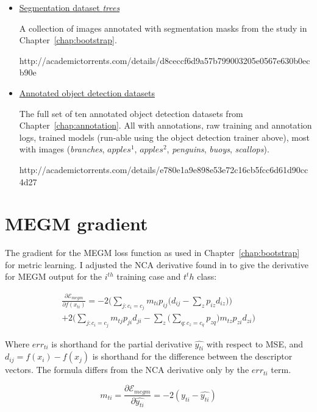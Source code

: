  \begin{itemize}
\item \href{http://academictorrents.com/details/d8ceccf6d9a57b799003205e0567e630b0ecb90e}{Segmentation dataset \emph{trees}} \par
A collection of images annotated with segmentation masks from the study in Chapter~\ref{chap:bootstrap}. \par\noindent http://academictorrents.com/details/d8ceccf6d9a57b799003205e0567e630b0ecb90e

\item \href{http://academictorrents.com/details/e780e1a9e898e53e72c16cb5fcc6d61d90cc4d27}{Annotated object detection datasets} \par
The full set of ten annotated object detection datasets from Chapter~\ref{chap:annotation}. All with annotations, raw training and annotation logs, trained models (run-able using the object detection trainer above), most with images (\emph{branches}, $apples^1$, $apples^2$, \emph{penguins}, \emph{buoys}, \emph{scallops}). \par\noindent
http://academictorrents.com/details/e780e1a9e898e53e72c16cb5fcc6d61d90cc4d27

\end{itemize}

\chapter{MEGM gradient}
\label{chap:megm_appendix} 

The gradient for the \gls{MEGM} loss function as used in Chapter~\ref{chap:bootstrap} for metric learning. I adjusted the \gls{NCA} derivative found in \cite {Salakhutdinov2007a} to give the derivative for \gls{MEGM} output for the $ i^{th} $ training case and $ t^th $ class:

\begin{multline}
\label{eq:megm_grad}
\frac{\partial \mathcal{E}_{megm}}{\partial f(x_{ti})} = 
  -2 \bigg( \sum_{j:c_i = c_j}  m_{ti} {p_{ij} \Big( d_{ij} - \sum_z{p_{iz}d_{iz}} \Big) } \bigg)\\
  +2 \bigg( \sum_{j:c_i = c_j} m_{tj}{p_{ji}d_{ji} - \sum_z{\Big( \sum_{q:c_z = c_q}{p_{zq}} \Big) m_{tz}p_{zi}d_{zi}   }} \bigg)
\end{multline}

Where $ err_{ti} $ is shorthand for the partial derivative $ \hat{y_{ti}} $ with respect to \gls{MSE}, and $ d_{ij} = f(x_i) - f(x_j) $ is shorthand for the difference between the descriptor vectors. The formula differs from the \gls{NCA} derivative only by the $ err_{ti} $ term.

\begin{equation}
m_{ti} = \frac{\partial \mathcal{E}_{megm}}{\partial \hat{y_{ti}}} = -2 (y_{ti} - \hat{y_{ti}})
\label{eq:megm_partial}
\end{equation}
